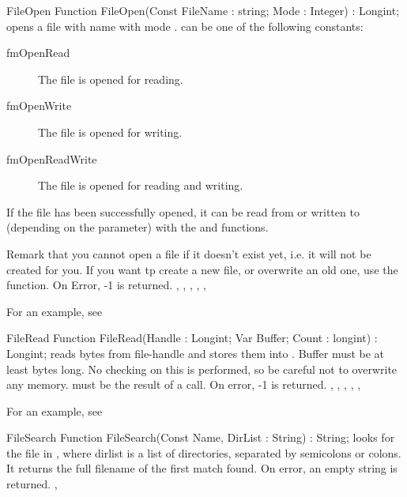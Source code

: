 \begin{function}{FileOpen}
\Declaration
Function FileOpen(Const FileName : string; Mode : Integer) : Longint;
\Description
{} opens a file with name  with mode .
 can be one of the following constants:
\begin{description}
\item[fmOpenRead] The file is opened for reading.
\item[fmOpenWrite] The file is opened for writing.
\item[fmOpenReadWrite] The file is opened for reading and writing.
\end{description}
If the file has been successfully opened, it can be read  from or written to
(depending on the  parameter) with the  and
 functions.

Remark that you cannot open a file if it doesn't exist yet, i.e. it will not
be created for you. If you want tp create a new file, or overwrite an old
one, use the  function.
\Errors
On Error, -1 is returned.
\SeeAlso
{}, , , ,
, 
\end{function}

For an example, see 

\begin{function}{FileRead}
\Declaration
Function FileRead(Handle : Longint; Var Buffer; Count : longint) : Longint;
\Description
{} reads  bytes from file-handle  and
stores them into . Buffer must be at least  bytes
long. No checking on this is performed, so be careful not to overwrite any
memory.   must be the result of a  call.
\Errors
On error, -1 is returned.
\SeeAlso
{}, , , ,
, 
\end{function}

For an example, see 

\begin{function}{FileSearch}
\Declaration
Function FileSearch(Const Name, DirList : String) : String;
\Description
{} looks for the file  in , where
dirlist is a list of directories, separated by semicolons or colons.
It returns the full filename of the first match found.
\Errors
On error, an empty string is returned.
\SeeAlso
{}, 
\end{function}

